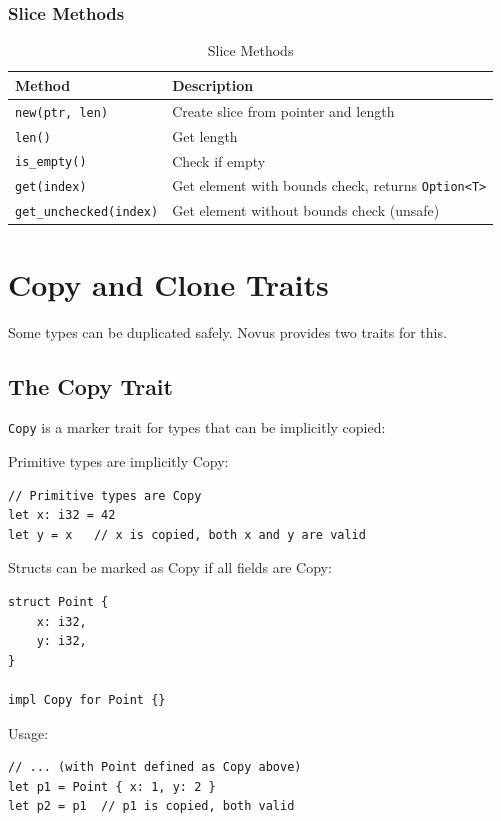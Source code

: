 \subsubsection{Slice Methods}

\begin{table}[h]
\centering
\begin{tabular}{lp{8cm}}
\hline
\textbf{Method} & \textbf{Description} \\
\hline
\texttt{new(ptr, len)} & Create slice from pointer and length \\
\texttt{len()} & Get length \\
\texttt{is\_empty()} & Check if empty \\
\texttt{get(index)} & Get element with bounds check, returns \texttt{Option<T>} \\
\texttt{get\_unchecked(index)} & Get element without bounds check (unsafe) \\
\hline
\end{tabular}
\caption{Slice Methods}
\end{table}

\section{Copy and Clone Traits}

Some types can be duplicated safely. Novus provides two traits for this.

\subsection{The Copy Trait}

\texttt{Copy} is a marker trait for types that can be implicitly copied:

Primitive types are implicitly Copy:

\begin{lstlisting}
// Primitive types are Copy
let x: i32 = 42
let y = x   // x is copied, both x and y are valid
\end{lstlisting}

Structs can be marked as Copy if all fields are Copy:

\begin{lstlisting}
struct Point {
    x: i32,
    y: i32,
}

impl Copy for Point {}
\end{lstlisting}

Usage:

\begin{lstlisting}
// ... (with Point defined as Copy above)
let p1 = Point { x: 1, y: 2 }
let p2 = p1  // p1 is copied, both valid
\end{lstlisting}


